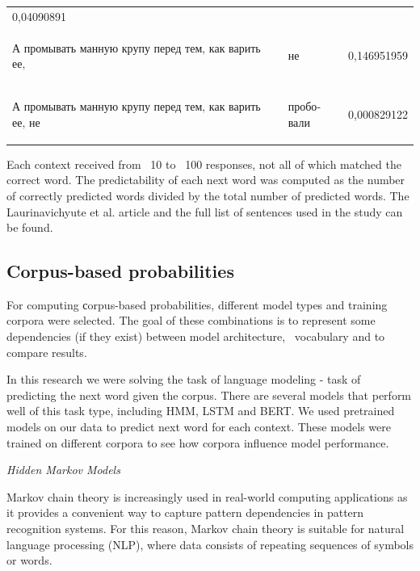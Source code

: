 \documentclass[a4paper]{article}
\newcommand{\head}[1]{\vspace{0.5em}\emph{#1}\vspace{0.25em}}
\begin{document}
\begin{table}
\begin{tabular}{llr}
0,04090891 \\
\begin{russian} А промывать манную крупу перед тем‚ как варить ее‚ \end{russian} &
\begin{russian} не \end{russian} &
0,146951959 \\
\begin{russian} А промывать манную крупу перед тем‚ как варить ее‚ не \end{russian} &
\begin{russian} пробовали \end{russian} &
0,000829122 \\
\end{tabular}
\end{table}


Each context received from ~10 to ~100 responses, not all of which matched the correct word. The predictability of each next word was computed as the number of correctly predicted words divided by the total number of predicted words. The Laurinavichyute et al. article and the full list of sentences used in the study can be found. 

\subsection{Corpus-based probabilities}

For computing сorpus-based probabilities, different model types and training corpora were selected. The goal of these combinations is to represent some dependencies (if they exist) between model architecture,  vocabulary and to compare results.



In this research we were solving the task of language modeling - task of predicting the next word given the corpus. 
There are several models that perform well of this task type, including HMM, LSTM and BERT. We used pretrained models on our data to predict next word for each context. These models were trained on different corpora to see how corpora influence model performance.

\head{Hidden Markov Models}

Markov chain theory is increasingly used in real-world computing applications as it provides a convenient way to capture pattern dependencies in pattern recognition systems. For this reason, Markov chain theory is suitable for natural language processing (NLP), where data consists of repeating sequences of symbols or words. 
\end{document}
